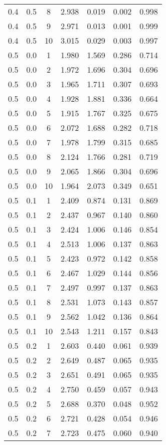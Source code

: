 \begin{tabular}{|c|c|c|c|c|c|c|}
0.4 & 0.5 & 8 & 2.938 & 0.019 & 0.002 & 0.998 \\
0.4 & 0.5 & 9 & 2.971 & 0.013 & 0.001 & 0.999 \\
0.4 & 0.5 & 10 & 3.015 & 0.029 & 0.003 & 0.997 \\
0.5 & 0.0 & 1 & 1.980 & 1.569 & 0.286 & 0.714 \\
0.5 & 0.0 & 2 & 1.972 & 1.696 & 0.304 & 0.696 \\
0.5 & 0.0 & 3 & 1.965 & 1.711 & 0.307 & 0.693 \\
0.5 & 0.0 & 4 & 1.928 & 1.881 & 0.336 & 0.664 \\
0.5 & 0.0 & 5 & 1.915 & 1.767 & 0.325 & 0.675 \\
0.5 & 0.0 & 6 & 2.072 & 1.688 & 0.282 & 0.718 \\
0.5 & 0.0 & 7 & 1.978 & 1.799 & 0.315 & 0.685 \\
0.5 & 0.0 & 8 & 2.124 & 1.766 & 0.281 & 0.719 \\
0.5 & 0.0 & 9 & 2.065 & 1.866 & 0.304 & 0.696 \\
0.5 & 0.0 & 10 & 1.964 & 2.073 & 0.349 & 0.651 \\
0.5 & 0.1 & 1 & 2.409 & 0.874 & 0.131 & 0.869 \\
0.5 & 0.1 & 2 & 2.437 & 0.967 & 0.140 & 0.860 \\
0.5 & 0.1 & 3 & 2.424 & 1.006 & 0.146 & 0.854 \\
0.5 & 0.1 & 4 & 2.513 & 1.006 & 0.137 & 0.863 \\
0.5 & 0.1 & 5 & 2.423 & 0.972 & 0.142 & 0.858 \\
0.5 & 0.1 & 6 & 2.467 & 1.029 & 0.144 & 0.856 \\
0.5 & 0.1 & 7 & 2.497 & 0.997 & 0.137 & 0.863 \\
0.5 & 0.1 & 8 & 2.531 & 1.073 & 0.143 & 0.857 \\
0.5 & 0.1 & 9 & 2.562 & 1.042 & 0.136 & 0.864 \\
0.5 & 0.1 & 10 & 2.543 & 1.211 & 0.157 & 0.843 \\
0.5 & 0.2 & 1 & 2.603 & 0.440 & 0.061 & 0.939 \\
0.5 & 0.2 & 2 & 2.649 & 0.487 & 0.065 & 0.935 \\
0.5 & 0.2 & 3 & 2.651 & 0.491 & 0.065 & 0.935 \\
0.5 & 0.2 & 4 & 2.750 & 0.459 & 0.057 & 0.943 \\
0.5 & 0.2 & 5 & 2.688 & 0.370 & 0.048 & 0.952 \\
0.5 & 0.2 & 6 & 2.721 & 0.428 & 0.054 & 0.946 \\
0.5 & 0.2 & 7 & 2.723 & 0.475 & 0.060 & 0.940 \\

\end{tabular}
